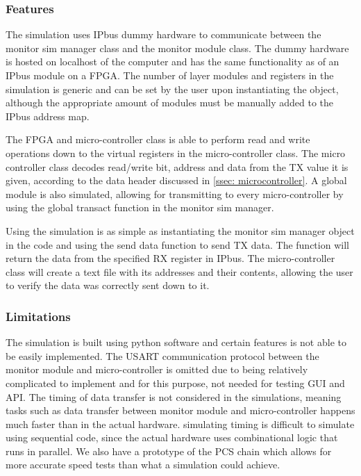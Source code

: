\documentclass[main.tex]{subfiles}
\begin{document}

\subsubsection{Features}

The simulation uses IPbus dummy hardware to communicate between the monitor sim manager class and the monitor module class. The dummy hardware is hosted on localhost of the computer and has the same functionality as of an IPbus module on a FPGA.  The number of layer modules and registers in the simulation is generic and can be set by the user upon instantiating the object, although the appropriate amount of modules must be manually added to the IPbus address map.

The FPGA and micro-controller class is able to perform read and write operations down to the virtual registers in the micro-controller class. The micro controller class decodes read/write bit, address and data from the TX value it is given, according to the data header discussed in \autoref{ssec: microcontroller}. A global module is also simulated, allowing for transmitting to every micro-controller by using the global transact function in the monitor sim manager. 

Using the simulation is as simple as instantiating the monitor sim manager object in the code and using the send data function to send TX data. The function will return the data from the specified RX register in IPbus. The micro-controller class will create a text file with its addresses and their contents, allowing the user to verify the data was correctly sent down to it.

\subsubsection{Limitations}

The simulation is built using python software and certain features is not able to be easily implemented. The USART communication protocol between the monitor module and micro-controller is omitted due to being relatively complicated to implement and for this purpose, not needed for testing GUI and API. 
The timing of data transfer is not considered in the simulations, meaning tasks such as data transfer between monitor module and micro-controller happens much faster than in the actual hardware. simulating timing is difficult to simulate using sequential code, since the actual hardware uses combinational logic that runs in parallel. We also have a prototype of the PCS chain which allows for more accurate speed tests than what a simulation could achieve. 
\end{document}
